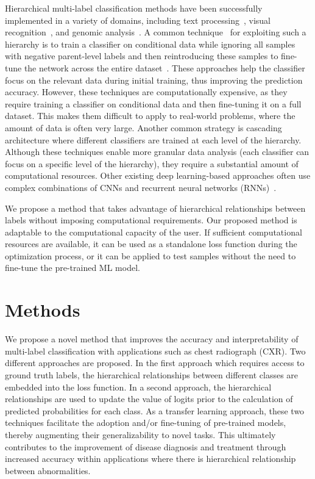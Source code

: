 Hierarchical multi-label classification methods have been successfully implemented in a variety of domains, including text processing~\cite{aly_Hierarchical_2019}, visual recognition~\cite{bi_Mandatory_2014}, and genomic analysis~\cite{bi_BayesOptimal_2015}. A common technique~\cite{chen_Deep_2019} for exploiting such a hierarchy is to train a classifier on conditional data while ignoring all samples with negative parent-level labels and then reintroducing these samples to fine-tune the network across the entire dataset~\cite{chen_Deep_2019}. These approaches help the classifier focus on the relevant data during initial training, thus improving the prediction accuracy.  However, these techniques are computationally expensive, as they require training a classifier on conditional data and then fine-tuning it on a full dataset. This makes them difficult to apply to real-world problems, where the amount of data is often very large.   Another common strategy is cascading architecture where different classifiers are trained at each level of the hierarchy. Although these techniques enable more granular data analysis (each classifier can focus on a specific level of the hierarchy), they require a substantial amount of computational resources. Other existing deep learning-based approaches often use complex combinations of CNNs and recurrent neural networks (RNNs)~\cite{guo_CNNRNN_2018,kowsari_HDLTex_2017}.

We propose a method that takes advantage of hierarchical relationships between labels without imposing computational requirements. Our proposed method is adaptable to the computational capacity of the user. If sufficient computational resources are available, it can be used as a standalone loss function during the optimization process, or it can be applied to test samples without the need to fine-tune the pre-trained ML model.

\section{Methods}\label{sec:methods}
We propose a novel method that improves the accuracy and interpretability of multi-label classification with applications such as chest radiograph (CXR). Two different approaches are proposed.  In the first approach which requires access to ground truth labels, the hierarchical relationships between different classes are embedded into the loss function. In a second approach, the hierarchical relationships are used to update the value of logits prior to the calculation of predicted probabilities for each class.  As a transfer learning approach, these two techniques facilitate the adoption and/or fine-tuning of pre-trained models, thereby augmenting their generalizability to novel tasks. This ultimately contributes to the improvement of disease diagnosis and treatment through increased accuracy within applications where there is hierarchical relationship between abnormalities.

